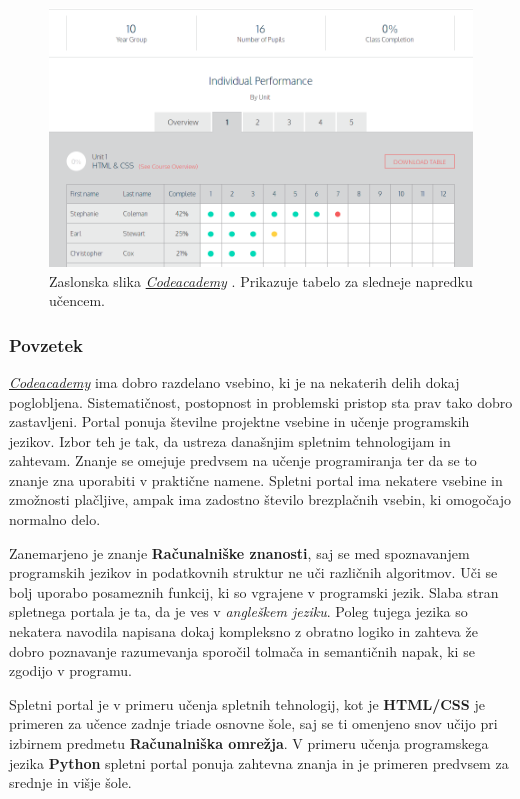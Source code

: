 \begin{figure}[h!]
  \centering
    \includegraphics [width=0.65\linewidth, keepaspectratio =
   1] {./images/sc_web/codeacademy_tracking_01.png}
   \caption{Zaslonska slika
     \emph{\href{https://www.codecademy.com/}{Codeacademy}}
     \cite{web:codeacademy}. Prikazuje tabelo za sledneje napredku
     učencem.}
    \label{fig:scr:web:codeacademy:tracking}
\end{figure}


\subsubsection{Povzetek}

\emph{\href{https://www.codecademy.com/}{Codeacademy}}
\cite{web:codeacademy} ima dobro razdelano vsebino, ki je na nekaterih
delih dokaj poglobljena. Sistematičnost, postopnost in problemski
pristop sta prav tako dobro zastavljeni. Portal ponuja številne
projektne vsebine in učenje programskih jezikov. Izbor teh je tak, da
ustreza današnjim spletnim tehnologijam in zahtevam. Znanje se omejuje
predvsem na učenje programiranja ter da se to znanje zna uporabiti v
praktične namene. Spletni portal ima nekatere vsebine in zmožnosti
plačljive, ampak ima zadostno število brezplačnih vsebin, ki omogočajo
normalno delo.

Zanemarjeno je znanje \textbf{Računalniške znanosti}, saj se med
spoznavanjem programskih jezikov in podatkovnih struktur ne uči
različnih algoritmov. Uči se bolj uporabo posameznih funkcij, ki so
vgrajene v programski jezik. Slaba stran spletnega portala je ta, da
je ves v \emph{angleškem jeziku}. Poleg tujega jezika so nekatera
navodila napisana dokaj kompleksno z obratno logiko in zahteva že
dobro poznavanje razumevanja sporočil tolmača in semantičnih napak, ki
se zgodijo v programu.


Spletni portal je v primeru učenja spletnih tehnologij, kot je
\textbf{HTML/CSS} je primeren za učence zadnje triade osnovne šole,
saj se ti omenjeno snov učijo pri izbirnem predmetu
\textbf{Računalniška omrežja}. V primeru učenja programskega jezika
\textbf{Python} spletni portal ponuja zahtevna znanja in je primeren
predvsem za srednje in višje šole.

